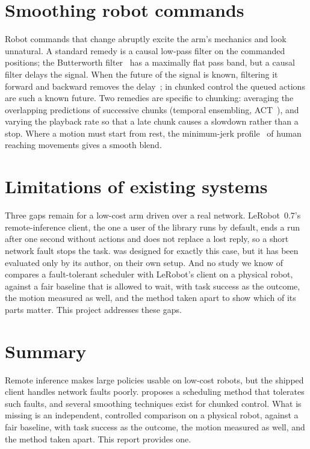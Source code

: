
\section{Smoothing robot commands}

Robot commands that change abruptly excite the arm's mechanics and look unnatural. A standard remedy is a causal
low-pass filter on the commanded positions; the Butterworth filter~\cite{butterworth1930} has a maximally flat pass band,
but a causal filter delays the signal. When the future of the signal is known, filtering it forward and backward
removes the delay~\cite{gustafsson1996}; in chunked control the queued actions are such a known future. Two remedies are
specific to chunking: averaging the overlapping predictions of successive chunks (temporal ensembling,
ACT~\cite{zhao2023act}), and varying the playback rate so that a late chunk causes a slowdown rather than a stop. Where
a motion must start from rest, the minimum-jerk profile~\cite{flash1985} of human reaching movements gives a smooth
blend.

\section{Limitations of existing systems}\label{sec:bg-limits}
Three gaps remain for a low-cost arm driven over a real network. LeRobot~0.7's remote-inference client, the one a
user of the library runs by default, ends a run after one second without actions and does not replace a lost reply,
so a short network fault stops the task. \drtc{} was designed for exactly this case, but it has been evaluated only by
its author, on their own setup. And no study we know of compares a fault-tolerant scheduler with LeRobot's client on a
physical robot, against a fair baseline that is allowed to wait, with task success as the outcome, the motion measured
as well, and the method taken apart to show which of its parts matter. This project addresses these gaps.

\section{Summary}

Remote inference makes large policies usable on low-cost robots, but the shipped client handles network faults poorly.
\drtc{} proposes a scheduling method that tolerates such faults, and several smoothing techniques exist for chunked control.
What is missing is an independent, controlled comparison on a physical robot, against a fair baseline, with task success
as the outcome, the motion measured as well, and the method taken apart. This report provides one.
